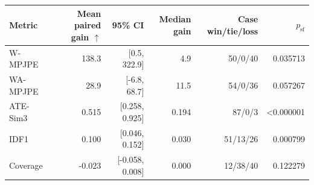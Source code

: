 \begin{tabular}{lrrrrr}
\toprule
Metric & Mean paired gain $\uparrow$ & 95\% CI & Median gain & Case win/tie/loss & $p_{\mathrm{sf}}$ \\
\midrule
W-MPJPE & 138.3 & [0.5, 322.9] & 4.9 & 50/0/40 & 0.035713 \\
WA-MPJPE & 28.9 & [-6.8, 68.7] & 11.5 & 54/0/36 & 0.057267 \\
ATE-Sim3 & 0.515 & [0.258, 0.925] & 0.194 & 87/0/3 & <0.000001 \\
IDF1 & 0.100 & [0.046, 0.152] & 0.030 & 51/13/26 & 0.000799 \\
Coverage & -0.023 & [-0.058, 0.008] & 0.000 & 12/38/40 & 0.122279 \\
\bottomrule
\end{tabular}
